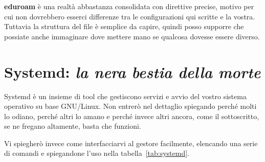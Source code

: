 \documentclass[twoside,italian]{book}
\begin{document}
    \textbf{eduroam} è una realtà abbastanza consolidata con direttive precise, motivo per cui non dovrebbero esserci differenze tra le configurazioni qui scritte e la vostra. Tuttavia la struttura del file è semplice da capire, quindi posso supporre che possiate anche immaginare dove mettere mano se qualcosa dovesse essere diverso.

\section{Systemd: \emph{la nera bestia della morte}}
    
    Systemd è un insieme di tool che gestiscono servizi e avvio del vostro sistema operativo su base GNU/Linux. Non entrerò nel dettaglio spiegando perché molti lo odiano, perché altri lo amano e perché invece altri ancora, come il sottoscritto, se ne fregano altamente, basta che funzioni.
    
    Vi spiegherò invece come interfacciarvi al gestore facilmente, elencando una serie di comandi e spiegandone l'uso nella tabella~\ref{tab:systemd}.
    
\end{document}
